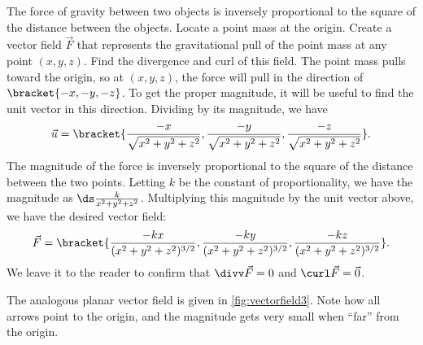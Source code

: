 \begin{example}\label{ex_vectorfield3}
The force of gravity between two objects is inversely proportional to the square of the distance between the objects. Locate a point mass at the origin. Create a vector field $\vec F$ that represents the gravitational pull of the point mass at any point $(x,y,z)$. Find the divergence and curl of this field.
\solution
The point mass pulls toward the origin, so at $(x,y,z)$, the force will pull in the direction of $\bracket{-x, -y, -z}$. To get the proper magnitude, it will be useful to find the unit vector in this direction. Dividing by its magnitude, we have
\[
\vec u
= \bracket{\frac{-x}{\sqrt{x^2+y^2+z^2}}, \frac{-y}{\sqrt{x^2+y^2+z^2}},\frac{-z}{\sqrt{x^2+y^2+z^2}}}.
\]
The magnitude of the force is inversely proportional to the square of the distance between the two points. Letting $k$ be the constant of proportionality, we have the magnitude as $\ds\frac{k}{x^2+y^2+z^2}$. Multiplying this magnitude by the unit vector above, we have the desired vector field:
%
%
\[
\vec F
=\bracket{\frac{-kx}{(x^2+y^2+z^2)^{3/2}}, \frac{-ky}{(x^2+y^2+z^2)^{3/2}},\frac{-kz}{(x^2+y^2+z^2)^{3/2}}}.
\]
We leave it to the reader to confirm that $\divv \vec F = 0$ and $\curl \vec F = \vec 0$.

The analogous planar vector field is given in \autoref{fig:vectorfield3}. Note how all arrows point to the origin, and the magnitude gets very small when ``far'' from the origin.
\end{example}

